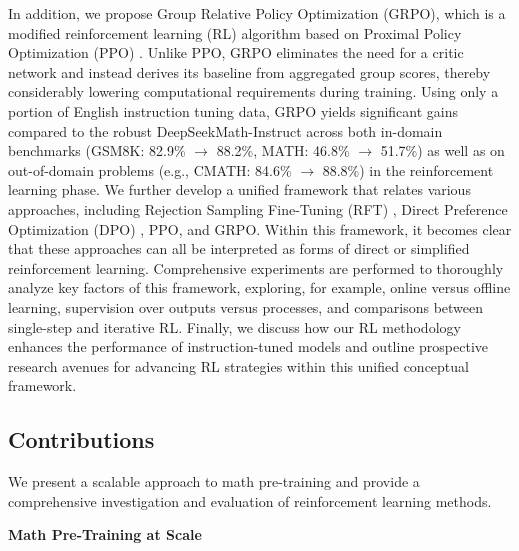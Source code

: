 In addition, we propose Group Relative Policy Optimization (GRPO), which is a modified reinforcement learning (RL) algorithm based on Proximal Policy Optimization (PPO) \citep{schulman2017proximal}. Unlike PPO, GRPO eliminates the need for a critic network and instead derives its baseline from aggregated group scores, thereby considerably lowering computational requirements during training. Using only a portion of English instruction tuning data, GRPO yields significant gains compared to the robust DeepSeekMath-Instruct across both in-domain benchmarks (GSM8K: 82.9\% $\rightarrow$ 88.2\%, MATH: 46.8\% $\rightarrow$ 51.7\%) as well as on out-of-domain problems (e.g., CMATH: 84.6\% $\rightarrow$ 88.8\%) in the reinforcement learning phase. We further develop a unified framework that relates various approaches, including Rejection Sampling Fine-Tuning (RFT) \citep{yuan2023scaling}, Direct Preference Optimization (DPO) \citep{dpo}, PPO, and GRPO. Within this framework, it becomes clear that these approaches can all be interpreted as forms of direct or simplified reinforcement learning. Comprehensive experiments are performed to thoroughly analyze key factors of this framework, exploring, for example, online versus offline learning, supervision over outputs versus processes, and comparisons between single-step and iterative RL. Finally, we discuss how our RL methodology enhances the performance of instruction-tuned models and outline prospective research avenues for advancing RL strategies within this unified conceptual framework.

\subsection{Contributions}
We present a scalable approach to math pre-training and provide a comprehensive investigation and evaluation of reinforcement learning methods.

\textbf{Math Pre-Training at Scale}

